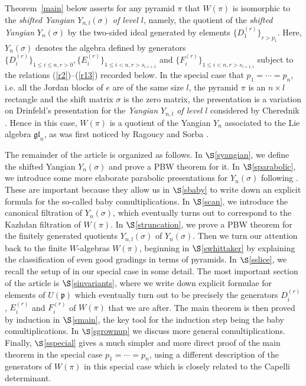 \documentclass[twoside,12pt,reqno]{amsart}
\begin{document}
Theorem~\ref{main} below asserts for any pyramid $\pi$ that 
$W(\pi)$ is isomorphic to the
{\em shifted Yangian $Y_{n,l}(\sigma)$ of level $l$}, namely,
the quotient of the {\em shifted Yangian} $Y_n(\sigma)$
by the two-sided ideal
generated by elements $\{D_1^{(r)}\}_{r > p_1}$.
Here, $Y_n(\sigma)$
denotes the algebra defined by generators
$\{D_i^{(r)}\}_{1 \leq i \leq n, r > 0},
\{E_i^{(r)}\}_{1 \leq i < n, r > s_{i,i+1}}$ and
$\{F_i^{(r)}\}_{1 \leq i < n, r > s_{i+1,i}}$
subject to the relations 
(\ref{r2})--(\ref{r13}) recorded below.
In the special case that $p_1 = \cdots = p_n$, i.e. 
all the Jordan
blocks of $e$ are of the same size $l$, the
pyramid $\pi$ is an $n \times l$ rectangle and the shift matrix
$\sigma$ is the zero matrix, the presentation is
a variation on
Drinfeld's presentation \cite{D3} for the {\em Yangian $Y_{n,l}$ 
of level $l$}
considered by Cherednik \cite{Ch0,Ch}.
Hence in this case, $W(\pi)$ is a quotient of the Yangian $Y_n$
associated to the Lie algebra $\mathfrak{gl}_n$,
as was first noticed by Ragoucy and Sorba \cite{RS}. 

The remainder of the article is organized as follows.
In $\S$\ref{syangian}, we define the shifted Yangian
$Y_n(\sigma)$ and prove a PBW theorem for it.
In $\S$\ref{sparabolic}, we introduce some more elaborate
parabolic presentations for $Y_n(\sigma)$ following
\cite{BK}. These are important because they
allow us in $\S$\ref{sbaby} 
to write down an explicit formula for the so-called baby 
comultiplications.
In $\S$\ref{scan}, we introduce the canonical filtration of 
$Y_n(\sigma)$, which eventually turns out to correspond to the
Kazhdan filtration of $W(\pi)$.
In $\S$\ref{struncation}, we prove a PBW theorem
for the finitely generated quotients
$Y_{n,l}(\sigma)$ of $Y_n(\sigma)$.
Then we turn our attention back
to the finite $W$-algebras $W(\pi)$, beginning in
$\S$\ref{swhittaker} by
explaining the classification of even good gradings in terms of
pyramids. In $\S$\ref{sslice}, we recall the setup of
\cite{GG} in our special case in some detail.
The most important section of the article is
$\S$\ref{sinvariants}, where we write down explicit
formulae for elements of $U(\mathfrak{p})$ which eventually
turn out to be precisely the generators $D_i^{(r)}$,
$E_i^{(r)}$ and $F_i^{(r)}$ of $W(\pi)$ that we are after.
The main theorem is then proved by induction 
in $\S$\ref{smain}, the key tool for the induction step
being the baby comultiplications. 
In $\S$\ref{sgrownup} we discuss more general comultiplications. 
Finally, $\S$\ref{sspecial} gives a much simpler
and more direct proof of the main theorem in the
special case $p_1=\cdots=p_n$, using a different 
description of the generators of $W(\pi)$ in this special case
which is closely related to the Capelli determinant.
\end{document}
